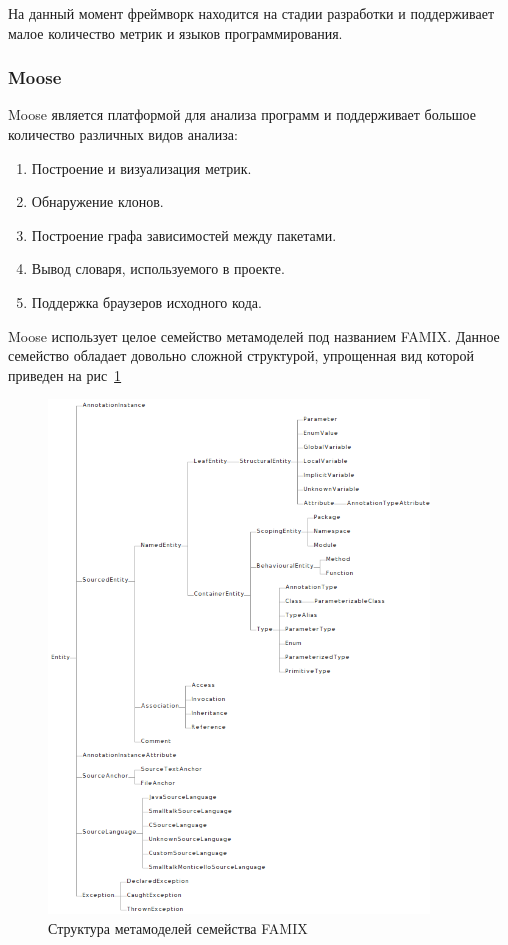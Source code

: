 На данный момент фреймворк находится на стадии разработки и поддерживает
малое количество метрик и языков программирования.

\subsubsection{Moose} %

Moose является платформой для анализа программ и поддерживает большое количество
различных видов анализа:

\begin{enumerate}
    \item Построение и визуализация метрик.
    \item Обнаружение клонов.
    \item Построение графа зависимостей между пакетами.
    \item Вывод словаря, используемого в проекте.
    \item Поддержка браузеров исходного кода.
\end{enumerate}

Moose использует целое семейство метамоделей под названием FAMIX. Данное
семейство обладает довольно сложной структурой, упрощенная вид которой приведен
на рис~\ref{fig:famix_hierarchy}

\begin{figure}[h!]
     \begin{center}
         \includegraphics[width=0.9\textwidth]{img/famix_hierarchy.png}
     \end{center}
     \caption{Структура метамоделей семейства FAMIX}
     \label{fig:famix_hierarchy}
 \end{figure}

